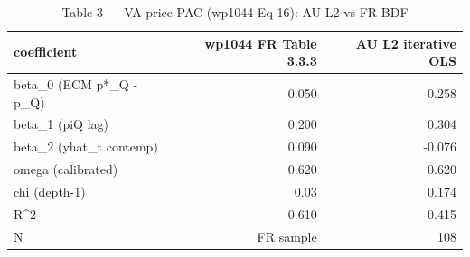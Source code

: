 \begin{table}[ht]
\centering
\caption{Table 3 — VA-price PAC (wp1044 Eq 16): AU L2 vs FR-BDF}
\begin{tabular}{lrr}
\toprule
coefficient & wp1044 FR Table 3.3.3 & AU L2 iterative OLS \\
\midrule
beta_0 (ECM p*_Q - p_Q) & 0.050 & 0.258 \\
beta_1 (piQ lag) & 0.200 & 0.304 \\
beta_2 (yhat_t contemp) & 0.090 & -0.076 \\
omega (calibrated) & 0.620 & 0.620 \\
chi (depth-1) & ~0.03 & 0.174 \\
R^2 & 0.610 & 0.415 \\
N & FR sample & 108 \\
\bottomrule
\end{tabular}
\end{table}
